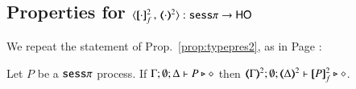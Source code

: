 %


\subsection{Properties for $\fencod{\cdot}{\cdot}{2}{f}: \sessp \to \HO$}
\label{app:enc_sesp_to_HO}

We repeat the statement of Prop.~\ref{prop:typepres2}, as in Page \pageref{prop:typepres2}:

\begin{proposition}
Let $P$ be a  $\mathtt{sess}\pi$ process.
If			$\Gamma; \emptyset; \Delta \vdash P \triangleright \diamond$ then 
			$\mapt{\Gamma}^{2}; \emptyset; \mapt{\Delta}^{2} \proves \map{P}_f^{2} \hastype \Proc$. 
\end{proposition}

